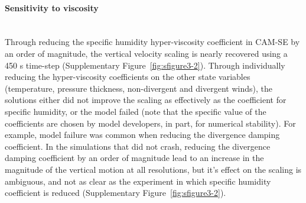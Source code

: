 \paragraph{Sensitivity to viscosity} ~\\
Through reducing the specific humidity hyper-viscosity coefficient in CAM-SE by an order of magnitude, the vertical velocity scaling is nearly recovered using a 450 s time-step (Supplementary Figure~\ref{fig:sfigure3-2}). Through individually reducing the hyper-viscosity coefficients on the other state variables (temperature, pressure thickness, non-divergent and divergent winds), the solutions either did not improve the scaling as effectively as the coefficient for specific humidity, or the model failed (note that the specific value of the coefficients are chosen by model developers, in part, for numerical stability). For example, model failure was common when reducing the divergence damping coefficient. In the simulations that did not crash, reducing the divergence damping coefficient by an order of magnitude lead to an increase in the magnitude of the vertical motion at all resolutions, but it’s effect on the scaling is ambiguous, and not as clear as the experiment in which specific humidity coefficient is reduced (Supplementary Figure~\ref{fig:sfigure3-2}).

